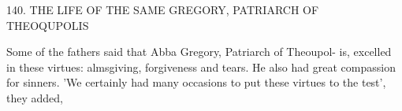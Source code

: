140. THE LIFE OF THE SAME GREGORY,
PATRIARCH OF THEOQUPOLIS

Some of the fathers said that Abba Gregory, Patriarch of Theoupol-
is, excelled in these virtues: almsgiving, forgiveness and tears. He
also had great compassion for sinners. 'We certainly had many
occasions to put these virtues to the test', they added,


